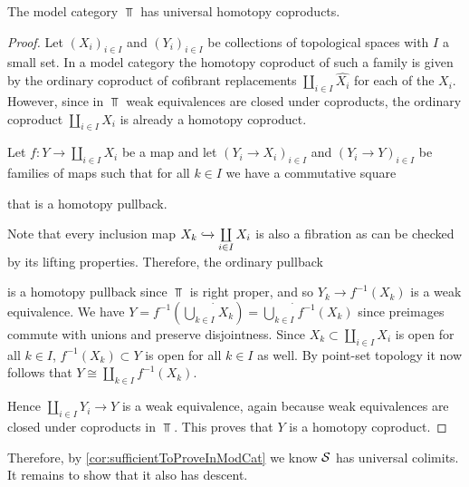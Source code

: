 \begin{lemma}\label{lem:topUniversalCoproduct}
    The model category $\Top$ has universal homotopy coproducts.
    \begin{proof}
        	Let $\left(X_i\right)_{i\in I}$ and $\left(Y_i\right)_{i\in I}$ be collections of topological spaces with $I$ a small set. 
            In a model category the homotopy coproduct of such a family is given by the ordinary coproduct of cofibrant replacements $\coprod\limits_{i\in I}\widehat{X_i}$ for each of the $X_i$.
            However, since in $\Top$ weak equivalences are closed under coproducts, the ordinary coproduct $\coprod\limits_{i\in I}X_i$ is already a homotopy coproduct.

            Let $f\colon Y\to\coprod\limits_{i\in I}X_i$ be a map and let $\left(Y_i\to X_i\right)_{i\in I}$ and $\left(Y_i\to Y\right)_{i\in I}$ be families of maps such that for all $k\in I$ we have a commutative square
            \begin{center}
            \end{center}
            that is a homotopy pullback.

            Note that every inclusion map $X_k\xhookrightarrow{}\coprod\limits_{i\in I} X_i$ is also a fibration as can be checked by its lifting properties.
            Therefore, the ordinary pullback
            \begin{center}
            \end{center}
            is a homotopy pullback since $\Top$ is right proper, and so $Y_k\to f^{-1}(X_k)$ is a weak equivalence.
            We have $Y=f^{-1}\left(\dot{\bigcup\limits_{k\in I}} X_k\right)=\dot{\bigcup\limits_{k\in I}}f^{-1}(X_k)$ since preimages commute with unions and preserve disjointness.
            Since $X_k\subset\coprod\limits_{i\in I} X_i$ is open for all $k\in I$, $f^{-1}(X_k)\subset Y$ is open for all $k\in I$ as well. 
            By point-set topology it now follows that $Y\cong\coprod\limits_{k\in I}f^{-1}(X_k)$.
            
            Hence $\coprod\limits_{i\in I}Y_i\to Y$ is a weak equivalence, again because weak equivalences are closed under coproducts in $\Top$.
            This proves that $Y$ is a homotopy coproduct.
    \end{proof}
\end{lemma}
Therefore, by \cref{cor:sufficientToProveInModCat} we know $\mathcal{S}$ has universal colimits.
It remains to show that it also has descent.
